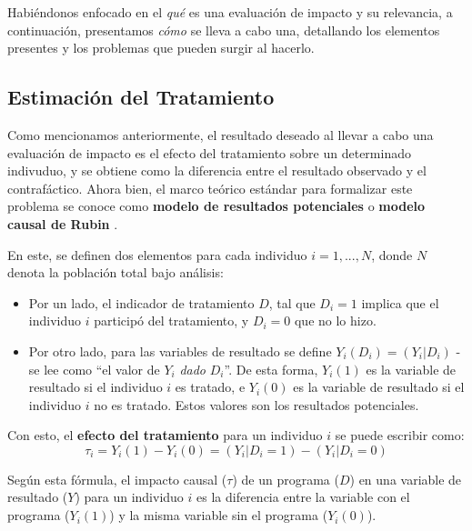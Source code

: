 \documentclass[../../main.tex]{subfiles}
\begin{document}
Habiéndonos enfocado en el \textit{qué} es una evaluación de impacto y su relevancia, a
continuación, presentamos \textit{cómo} se lleva a cabo una, detallando los elementos
presentes y los problemas que pueden surgir al hacerlo.

\subsection{Estimación del Tratamiento}
Como mencionamos anteriormente, el resultado deseado al llevar a cabo una evaluación de
impacto es el efecto del tratamiento sobre un determinado indivuduo, y se obtiene como la
diferencia entre el resultado observado y el contrafáctico. Ahora bien, el marco teórico
estándar para formalizar este problema se conoce como \textbf{modelo de resultados
potenciales} o \textbf{modelo causal de Rubin} \cite{rubin1974}.

En este, se definen dos elementos para cada individuo \(i = 1,...,N\), donde \(N\)
denota la población total bajo análisis:
\begin{itemize}[itemsep=0.2cm]
    \item Por un lado, el indicador de tratamiento \(D\), tal que \(D_i = 1\) implica
    que el individuo \(i\) participó del tratamiento, y \(D_i = 0\) que no lo hizo.
    \item Por otro lado, para las variables de resultado se define \(Y_i(D_i) = (Y_i|D_i)\)
    - se lee como ``el valor de \(Y_i\) \textit{dado} \(D_i\)''. De esta forma, \(Y_i(1)\)
    es la variable de resultado si el individuo \(i\) es tratado, e \(Y_i(0)\) es la
    variable de resultado si el individuo \(i\) no es tratado. Estos valores son los
    resultados potenciales.
\end{itemize}

Con esto, el \textbf{efecto del tratamiento} para un individuo \(i\) se puede escribir como:
\begin{equation}
    \tau_i = Y_i(1) - Y_i(0) = (Y_i|D_i=1) - (Y_i|D_i=0)
    \label{eq:ite} %
\end{equation}

Según esta fórmula, el impacto causal (\(\tau\)) de un programa (\(D\)) en una variable de
resultado (\(Y\)) para un individuo \(i\) es la diferencia entre la variable con el
programa (\(Y_i(1)\)) y la misma variable sin el programa (\(Y_i(0)\)).
\end{document}

